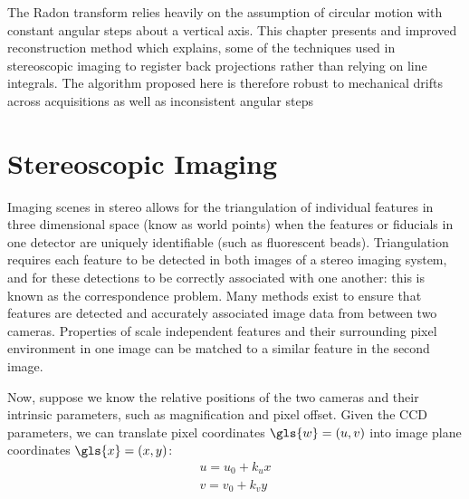 The Radon transform relies heavily on the assumption of circular motion with constant angular steps about a vertical axis.
This chapter presents and improved reconstruction method which explains, some of the techniques used in stereoscopic imaging to register back projections rather than relying on line integrals.
The algorithm proposed here is therefore robust to mechanical drifts across acquisitions as well as inconsistent angular steps

\section{Stereoscopic Imaging}





Imaging scenes in stereo allows for the triangulation of individual features in three dimensional space (know as \gls{world point}s) when the features or fiducials in one detector are uniquely identifiable (such as fluorescent beads).
Triangulation requires each feature
to be detected in both images of a stereo imaging system, and for these detections to be correctly associated with one another:
this is known as the correspondence problem.
Many methods exist to ensure that features are%
detected and accurately associated
image data from
between two cameras. %
Properties of scale independent features and their surrounding pixel environment in one image can be matched to a similar feature in the second image.

Now, suppose we know the relative positions of the two cameras and their intrinsic parameters, such as magnification and pixel offset.
Given the \gls{CCD} parameters, we can translate pixel coordinates \(\gls{w} = (u, v)\) into \gls{image plane} coordinates \(\gls{x}=(x, y)\):
\begin{align}
    u = u_0 + k_u x \\
    v = v_0 + k_v y
\end{align}

